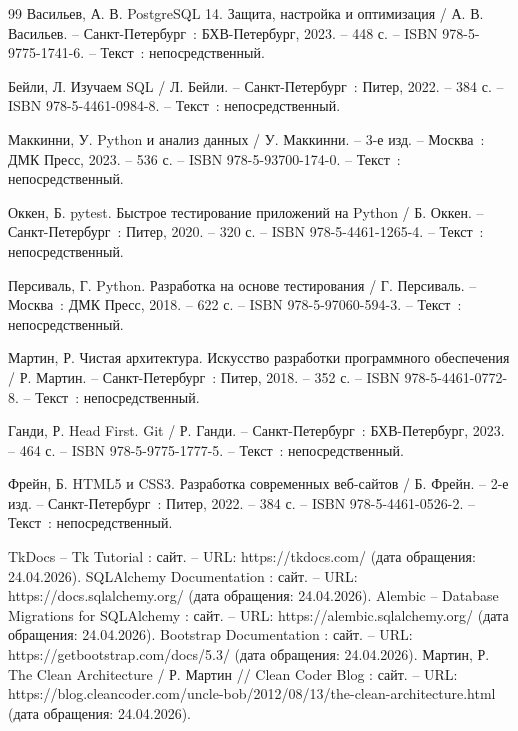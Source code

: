 \begin{thebibliography}{99}
	 Васильев, А. В. PostgreSQL 14. Защита, настройка и оптимизация / А. В. Васильев. -- Санкт-Петербург~: БХВ-Петербург, 2023. -- 448 с. -- ISBN 978-5-9775-1741-6. -- Текст~: непосредственный.
	
	 Бейли, Л. Изучаем SQL / Л. Бейли. -- Санкт-Петербург~: Питер, 2022. -- 384 с. -- ISBN 978-5-4461-0984-8. -- Текст~: непосредственный.
	
	 Маккинни, У. Python и анализ данных / У. Маккинни. -- 3-е изд. -- Москва~: ДМК Пресс, 2023. -- 536 с. -- ISBN 978-5-93700-174-0. -- Текст~: непосредственный.
	
	 Оккен, Б. pytest. Быстрое тестирование приложений на Python / Б. Оккен. -- Санкт-Петербург~: Питер, 2020. -- 320 с. -- ISBN 978-5-4461-1265-4. -- Текст~: непосредственный.
	
	 Персиваль, Г. Python. Разработка на основе тестирования / Г. Персиваль. -- Москва~: ДМК Пресс, 2018. -- 622 с. -- ISBN 978-5-97060-594-3. -- Текст~: непосредственный.
	
	 Мартин, Р. Чистая архитектура. Искусство разработки программного обеспечения / Р. Мартин. -- Санкт-Петербург~: Питер, 2018. -- 352 с. -- ISBN 978-5-4461-0772-8. -- Текст~: непосредственный.
	
	 Ганди, Р. Head First. Git / Р. Ганди. -- Санкт-Петербург~: БХВ-Петербург, 2023. -- 464 с. -- ISBN 978-5-9775-1777-5. -- Текст~: непосредственный.
	
	 Фрейн, Б. HTML5 и CSS3. Разработка современных веб-сайтов / Б. Фрейн. -- 2-е изд. -- Санкт-Петербург~: Питер, 2022. -- 384 с. -- ISBN 978-5-4461-0526-2. -- Текст~: непосредственный.
	
	 TkDocs -- Tk Tutorial : сайт. -- URL: https://tkdocs.com/ (дата обращения: 24.04.2026). 
	 SQLAlchemy Documentation : сайт. -- URL: https://docs.sqlalchemy.org/ (дата обращения: 24.04.2026).
	 Alembic -- Database Migrations for SQLAlchemy : сайт. -- URL: https://alembic.sqlalchemy.org/ (дата обращения: 24.04.2026). 
	 Bootstrap Documentation : сайт. -- URL: https://getbootstrap.com/docs/5.3/ (дата обращения: 24.04.2026). 
	 Мартин, Р. The Clean Architecture / Р. Мартин // Clean Coder Blog : сайт. -- URL: https://blog.cleancoder.com/uncle-bob/2012/08/13/the-clean-architecture.html (дата обращения: 24.04.2026). 
\end{thebibliography}